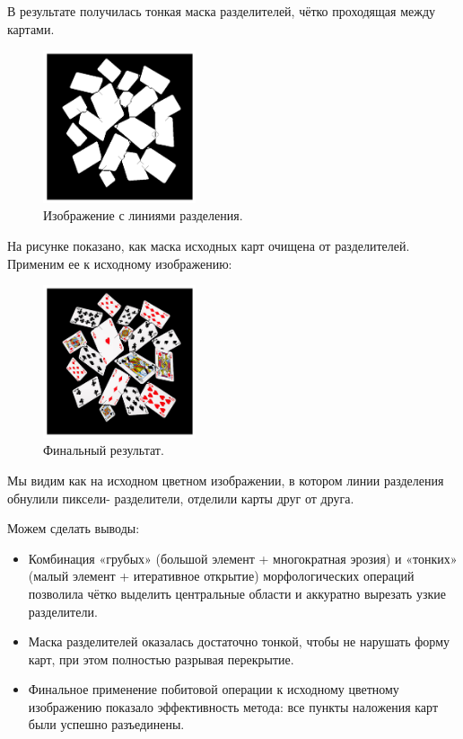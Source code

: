 \documentclass[a4paper,12pt]{article}
\begin{document}
В результате получилась тонкая маска разделителей, чётко проходящая между картами.

\begin{figure}[H]
    \centering
    \includegraphics[width=0.4\textwidth]{result/2_split.png}
    \caption{Изображение с линиями разделения.}
\end{figure}

На рисунке показано, как маска исходных карт очищена от разделителей. Применим ее к исходному изображению:

\begin{figure}[H]
    \centering
    \includegraphics[width=0.4\textwidth]{result/2_split_color.png}
    \caption{Финальный результат.}
\end{figure}

Мы видим как на исходном цветном изображении, в котором линии разделения обнулили пиксели- разделители, отделили карты друг от друга.

Можем сделать выводы:
\begin{itemize}
    \item Комбинация «грубых» (большой элемент + многократная эрозия) и «тонких» (малый элемент + итеративное открытие) морфологических операций позволила чётко выделить центральные области и аккуратно вырезать узкие разделители.
    \item Маска разделителей оказалась достаточно тонкой, чтобы не нарушать форму карт, при этом полностью разрывая перекрытие.
    \item Финальное применение побитовой операции к исходному цветному изображению показало эффективность метода: все пункты наложения карт были успешно разъединены.
\end{itemize} 
\end{document}
